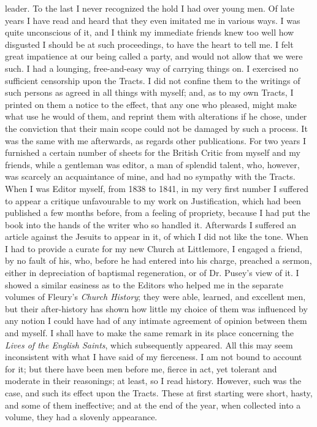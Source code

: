 leader. To the last I never recognized the hold I had over young men. Of
late years I have read and heard that they even imitated me in various
ways. I was quite unconscious of it, and I think my immediate friends
knew too well how disgusted I should be at such proceedings, to have
the heart to tell me. I felt great impatience at our being called a
party, and would not allow that we were such. I had a lounging,
free-and-easy way of carrying things on. I exercised no sufficient
censorship upon the Tracts. I did not confine them to the writings of
such persons as agreed in all things with myself; and, as to my own
Tracts, I printed on them a notice to the effect, that any one who
pleased, might make what use he would of them, and reprint them with
alterations if he chose, under the conviction that their main scope
could not be damaged by such a process. It was the same with me
afterwards, as regards other publications. For two years I furnished a
certain number of sheets for the British Critic from myself and my
friends, while a gentleman was editor, a man of splendid talent, who,
however, was scarcely an acquaintance of mine, and had no sympathy with
the Tracts. When I was Editor myself, from 1838 to 1841, in my very
first number I suffered to appear a critique unfavourable to my work on
Justification, which had been published a few months before, from a
feeling of propriety, because I had put the book into the hands of the
writer who so handled it. Afterwards I suffered an article against the
Jesuits to appear in it, of which I did not like the tone. When I had to
provide a curate for my new Church at Littlemore, I engaged a friend, by
no fault of his, who, before he had entered into his charge,
preached a sermon, either in depreciation of baptismal regeneration, or
of Dr. Pusey's view of it. I showed a similar easiness as to the Editors
who helped me in the separate volumes of Fleury's \emph{Church History}; they
were able, learned, and excellent men, but their after-history has shown how little my choice of them was influenced by any notion I could
have had of any intimate agreement of opinion between them and myself. I
shall have to make the same remark in its place concerning the \emph{Lives of
the English Saints}, which subsequently appeared. All this may seem
inconsistent with what I have said of my fierceness. I am not bound to
account for it; but there have been men before me, fierce in act, yet
tolerant and moderate in their reasonings; at least, so I read history.
However, such was the case, and such its effect upon the Tracts. These
at first starting were short, hasty, and some of them ineffective; and
at the end of the year, when collected into a volume, they had a
slovenly appearance.

